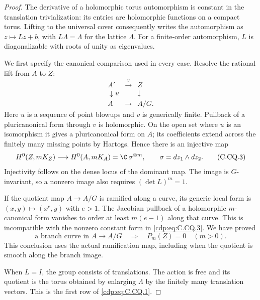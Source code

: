 \begin{proof}
The derivative of a holomorphic torus automorphism is
constant in the translation trivialization: its entries
are holomorphic functions on a compact torus. Lifting to
the universal cover consequently writes the automorphism
as $z\mapsto Lz+b$, with $L\Lambda=\Lambda$ for the
lattice $\Lambda$. For a finite-order automorphism, $L$
is diagonalizable with roots of unity as eigenvalues.

We first specify the canonical comparison used in every
case. Resolve the rational lift from $A$ to $Z$:
\[
\begin{array}{ccc}
A'&\xrightarrow{\ v\ }&Z\\
\downarrow{\scriptstyle u}&&\downarrow\\
A&\longrightarrow&A/G .
\end{array}                                                    \tag{C.CQ.2}\label{cdp:eq:C.CQ.2}
\]
Here $u$ is a sequence of point blowups and $v$ is
generically finite. Pullback of a pluricanonical form
through $v$ is holomorphic. On the open set where $u$
is an isomorphism it gives a pluricanonical form on
$A$; its coefficients extend across the finitely many
missing points by Hartogs. Hence there is an injective
map
\[
 H^0(Z,mK_Z)\longrightarrow H^0(A,mK_A)
                  =\C\,\sigma^{\otimes m},
 \qquad \sigma=dz_1\wedge dz_2 .
                                                               \tag{C.CQ.3}\label{cdp:eq:C.CQ.3}
\]
Injectivity follows on the dense locus of the dominant
map. The image is $G$-invariant, so a nonzero image
also requires $(\det L)^m=1$.

If the quotient map $A\to A/G$ is ramified along a
curve, its generic local form is
$(x,y)\mapsto(x^e,y)$ with $e>1$. The Jacobian
pullback of a holomorphic $m$-canonical form vanishes
to order at least $m(e-1)$ along that curve. This is
incompatible with the nonzero constant form in
\eqref{cdp:eq:C.CQ.3}. We have proved
\[
 \text{a branch curve in }A\longrightarrow A/G
       \quad\Longrightarrow\quad P_m(Z)=0\quad(m>0).
                                                               \tag{C.CQ.4}\label{cdp:eq:C.CQ.4}
\]
This conclusion uses the actual ramification map,
including when the quotient is smooth along the
branch image.

When $L=I$, the group consists of translations. The
action is free and its quotient is the torus obtained
by enlarging $\Lambda$ by the finitely many translation
vectors. This is the first row of \eqref{cdp:eq:C.CQ.1}.


\end{proof}
